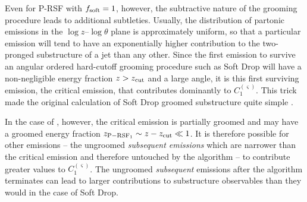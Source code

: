 Even for P-RSF with \(f_{\rm soft} = 1\), however, the subtractive nature of the grooming procedure leads to additional subtleties.
%
Usually, the distribution of partonic emissions in the \(\log z\)--\(\log \theta \) plane is approximately uniform, so that a particular emission will tend to have an exponentially higher contribution to the two-pronged substructure of a jet than any other.
%
Since the first emission to survive an angular ordered hard-cutoff grooming procedure such as Soft Drop will have a non-negligible energy fraction \(z > z_{\rm cut}\) and a large angle, it is this first surviving emission, the critical emission, that contributes dominantly to \(C_1^{(\varsigma)}\).
%
This trick made the original calculation of Soft Drop groomed substructure quite simple \cite{Larkoski:2014wba}.

In the case of , however, the critical emission is partially groomed and may have a groomed energy fraction \(z_{\rm P-RSF_{1}} \sim z - z_{\rm cut} \ll 1\).
%
It is therefore possible for other emissions -- the ungroomed \textit{subsequent emissions} which are narrower than the critical emission and therefore untouched by the  algorithm -- to contribute greater values to \(C_1^{(\varsigma)}\).
%
The ungroomed \textit{subsequent} emissions after the  algorithm terminates can lead to larger contributions to substructure observables than they would in the case of Soft Drop.

